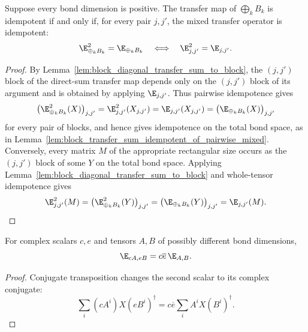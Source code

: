 \begin{theorem}%
    \label{thm:direct_sum_transfer_idempotent_iff_pairwise_mixed}
    \leanok
    Suppose every bond dimension is positive. The transfer map of
    $\bigoplus_k B_k$ is idempotent if and only if, for every pair $j,j'$,
    the mixed transfer operator is idempotent:
    \[
        \E_{\oplus_k B_k}^2=\E_{\oplus_k B_k}
        \quad\Longleftrightarrow\quad
        \E_{j,j'}^2=\E_{j,j'}.
    \]
\end{theorem}
\begin{proof}\leanok
    By Lemma~\ref{lem:block_diagonal_transfer_sum_to_block}, the $(j,j')$
    block of the direct-sum transfer map depends only on the $(j,j')$ block of
    its argument and is obtained by applying $\E_{j,j'}$. Thus pairwise
    idempotence gives
    \[
        \bigl(\E_{\oplus_k B_k}^2(X)\bigr)_{j,j'}
        = \E_{j,j'}^2(X_{j,j'})
        = \E_{j,j'}(X_{j,j'})
        = \bigl(\E_{\oplus_k B_k}(X)\bigr)_{j,j'}
    \]
    for every pair of blocks, and hence gives idempotence on the total bond
    space, as in
    Lemma~\ref{lem:block_transfer_sum_idempotent_of_pairwise_mixed}.
    Conversely, every matrix $M$ of the appropriate rectangular size occurs as
    the $(j,j')$ block of some $Y$ on the total bond space. Applying
    Lemma~\ref{lem:block_diagonal_transfer_sum_to_block} and whole-tensor
    idempotence gives
    \[
        \E_{j,j'}^2(M)
        = \bigl(\E_{\oplus_k B_k}^2(Y)\bigr)_{j,j'}
        = \bigl(\E_{\oplus_k B_k}(Y)\bigr)_{j,j'}
        = \E_{j,j'}(M).
    \]
\end{proof}

\begin{lemma}%
    \label{lem:mixed_transfer_rect_smul}
    \leanok
    For complex scalars $c,e$ and tensors $A,B$ of possibly different bond
    dimensions,
    \[
        \E_{cA,eB}=c\overline e\,\E_{A,B}.
    \]
\end{lemma}
\begin{proof}\leanok
    Conjugate transposition changes the second scalar to its complex conjugate:
    \[
        \sum_i (cA^i)X(eB^i)^\dagger
        =c\overline e\sum_i A^iX(B^i)^\dagger.
    \]
\end{proof}

